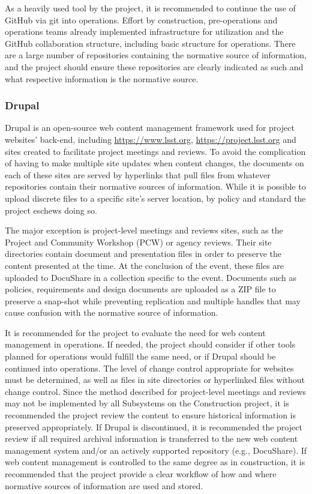 As a heavily used tool by the project, it is recommended to continue the use of GitHub via git into operations.
Effort by construction, pre-operations and operations teams already implemented infrastructure for utilization and the GitHub collaboration structure, including basic structure for operations.
There are a large number of repositories containing the normative source of information, and the project should ensure these repositories are clearly indicated as such and what respective information is the normative source.

\subsubsection{Drupal}

Drupal \citep{drupal-cite} is an open-source web content management framework used for project websites’ back-end, including \url{https://www.lsst.org}, \url{https://project.lsst.org} and sites created to facilitate project meetings and reviews.
To avoid the complication of having to make multiple site updates when content changes, the documents on each of these sites are served by hyperlinks that pull files from whatever repositories contain their normative sources of information.
While it is possible to upload discrete files to a specific site’s server location, by policy and standard the project eschews doing so.

The major exception is project-level meetings and reviews sites, such as the Project and Community Workshop (PCW) or agency reviews.
Their site directories contain document and presentation files in order to preserve the content presented at the time.
At the conclusion of the event, these files are uploaded to DocuShare in a collection specific to the event.
Documents such as policies, requirements and design documents are uploaded as a ZIP file to preserve a snap-shot while preventing replication and multiple handles that may cause confusion with the normative source of information.

It is recommended for the project to evaluate the need for web content management in operations.
If needed, the project should consider if other tools planned for operations would fulfill the same need, or if Drupal should be continued into operations.
The level of change control appropriate for websites must be determined, as well as files in site directories or hyperlinked files without change control.
Since the method described for project-level meetings and reviews may not be implemented by all Subsystems on the Construction project, it is recommended the project review the content to ensure historical information is preserved appropriately.
If Drupal is discontinued, it is recommended the project review if all required archival information is transferred to the new web content management system and/or an actively supported repository (e.g., DocuShare).
If web content management is controlled to the same degree as in construction, it is recommended that the project provide a clear workflow of how and where normative sources of information are used and stored.

